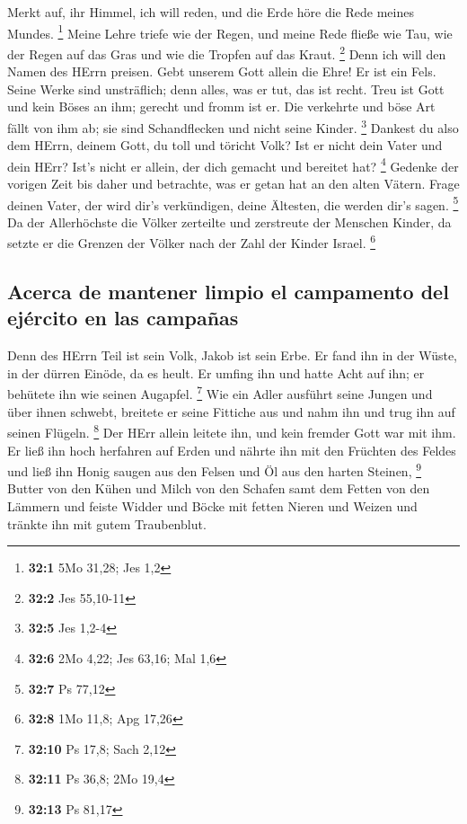  Merkt auf, ihr Himmel, ich will reden, und die Erde höre
die Rede meines Mundes. \footnote{\textbf{32:1} 5Mo 31,28; Jes 1,2}
 Meine Lehre triefe wie der Regen, und meine Rede fließe
wie Tau, wie der Regen auf das Gras und wie die Tropfen auf das Kraut.
\footnote{\textbf{32:2} Jes 55,10-11}  Denn ich will den
Namen des HErrn preisen. Gebt unserem Gott allein die Ehre!
 Er ist ein Fels. Seine Werke sind unsträflich; denn
alles, was er tut, das ist recht. Treu ist Gott und kein Böses an ihm;
gerecht und fromm ist er.  Die verkehrte und böse Art
fällt von ihm ab; sie sind Schandflecken und nicht seine Kinder.
\footnote{\textbf{32:5} Jes 1,2-4}  Dankest du also dem
HErrn, deinem Gott, du toll und töricht Volk? Ist er nicht dein Vater
und dein HErr? Ist's nicht er allein, der dich gemacht und bereitet hat?
\footnote{\textbf{32:6} 2Mo 4,22; Jes 63,16; Mal 1,6} 
Gedenke der vorigen Zeit bis daher und betrachte, was er getan hat an
den alten Vätern. Frage deinen Vater, der wird dir's verkündigen, deine
Ältesten, die werden dir's sagen. \footnote{\textbf{32:7} Ps 77,12}
 Da der Allerhöchste die Völker zerteilte und zerstreute
der Menschen Kinder, da setzte er die Grenzen der Völker nach der Zahl
der Kinder Israel. \footnote{\textbf{32:8} 1Mo 11,8; Apg 17,26}

\hypertarget{acerca-de-mantener-limpio-el-campamento-del-ejuxe9rcito-en-las-campauxf1as}{%
\subsection{Acerca de mantener limpio el campamento del ejército en las
campañas}\label{acerca-de-mantener-limpio-el-campamento-del-ejuxe9rcito-en-las-campauxf1as}}

 Denn des HErrn Teil ist sein Volk, Jakob ist sein Erbe.
 Er fand ihn in der Wüste, in der dürren Einöde, da es
heult. Er umfing ihn und hatte Acht auf ihn; er behütete ihn wie seinen
Augapfel. \footnote{\textbf{32:10} Ps 17,8; Sach 2,12} 
Wie ein Adler ausführt seine Jungen und über ihnen schwebt, breitete er
seine Fittiche aus und nahm ihn und trug ihn auf seinen Flügeln.
\footnote{\textbf{32:11} Ps 36,8; 2Mo 19,4}  Der HErr
allein leitete ihn, und kein fremder Gott war mit ihm. 
Er ließ ihn hoch herfahren auf Erden und nährte ihn mit den Früchten des
Feldes und ließ ihn Honig saugen aus den Felsen und Öl aus den harten
Steinen, \footnote{\textbf{32:13} Ps 81,17}  Butter von
den Kühen und Milch von den Schafen samt dem Fetten von den Lämmern und
feiste Widder und Böcke mit fetten Nieren und Weizen und tränkte ihn mit
gutem Traubenblut.

